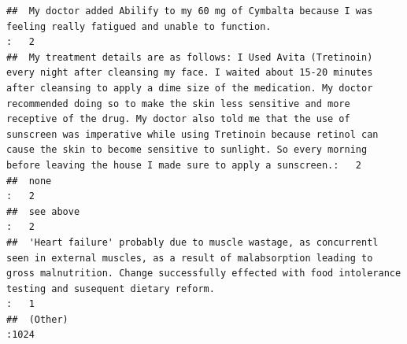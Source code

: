 \documentclass[spanish,]{article}
\begin{document}
\begin{verbatim}
##  My doctor added Abilify to my 60 mg of Cymbalta because I was feeling really fatigued and unable to function.                                                                                                                                                                                                                                                                                                                                                                                                               :   2  
##  My treatment details are as follows: I Used Avita (Tretinoin) every night after cleansing my face. I waited about 15-20 minutes after cleansing to apply a dime size of the medication. My doctor recommended doing so to make the skin less sensitive and more receptive of the drug. My doctor also told me that the use of sunscreen was imperative while using Tretinoin because retinol can cause the skin to become sensitive to sunlight. So every morning before leaving the house I made sure to apply a sunscreen.:   2  
##  none                                                                                                                                                                                                                                                                                                                                                                                                                                                                                                                        :   2  
##  see above                                                                                                                                                                                                                                                                                                                                                                                                                                                                                                                   :   2  
##  'Heart failure' probably due to muscle wastage, as concurrentl seen in external muscles, as a result of malabsorption leading to gross malnutrition. Change successfully effected with food intolerance testing and susequent dietary reform.                                                                                                                                                                                                                                                                               :   1  
##  (Other)                                                                                                                                                                                                                                                                                                                                                                                                                                                                                                                     :1024
\end{verbatim}
\end{document}
